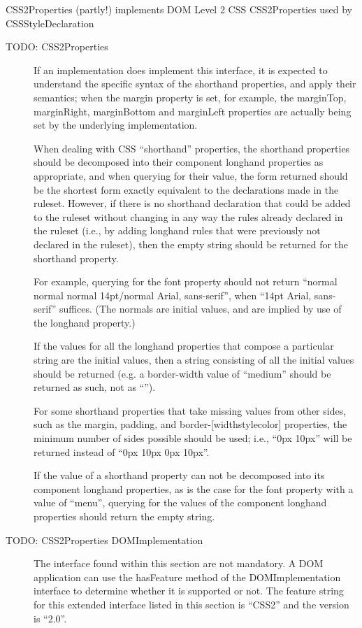 CSS2Properties (partly!) implements DOM Level 2 CSS CSS2Properties used
by CSSStyleDeclaration
\begin{description}
\item[{TODO: CSS2Properties}] \leavevmode 
If an implementation does implement this interface, it is expected to
understand the specific syntax of the shorthand properties, and apply
their semantics; when the margin property is set, for example, the
marginTop, marginRight, marginBottom and marginLeft properties are
actually being set by the underlying implementation.

When dealing with CSS ``shorthand'' properties, the shorthand properties
should be decomposed into their component longhand properties as
appropriate, and when querying for their value, the form returned
should be the shortest form exactly equivalent to the declarations made
in the ruleset. However, if there is no shorthand declaration that
could be added to the ruleset without changing in any way the rules
already declared in the ruleset (i.e., by adding longhand rules that
were previously not declared in the ruleset), then the empty string
should be returned for the shorthand property.

For example, querying for the font property should not return
``normal normal normal 14pt/normal Arial, sans-serif'', when
``14pt Arial, sans-serif'' suffices. (The normals are initial values, and
are implied by use of the longhand property.)

If the values for all the longhand properties that compose a particular
string are the initial values, then a string consisting of all the
initial values should be returned (e.g. a border-width value of
``medium'' should be returned as such, not as ``'').

For some shorthand properties that take missing values from other
sides, such as the margin, padding, and border-{[}width{\textbar}style{\textbar}color{]}
properties, the minimum number of sides possible should be used; i.e.,
``0px 10px'' will be returned instead of ``0px 10px 0px 10px''.

If the value of a shorthand property can not be decomposed into its
component longhand properties, as is the case for the font property
with a value of ``menu'', querying for the values of the component
longhand properties should return the empty string.

\item[{TODO: CSS2Properties DOMImplementation}] \leavevmode 
The interface found within this section are not mandatory. A DOM
application can use the hasFeature method of the DOMImplementation
interface to determine whether it is supported or not. The feature
string for this extended interface listed in this section is ``CSS2''
and the version is ``2.0''.

\end{description}


